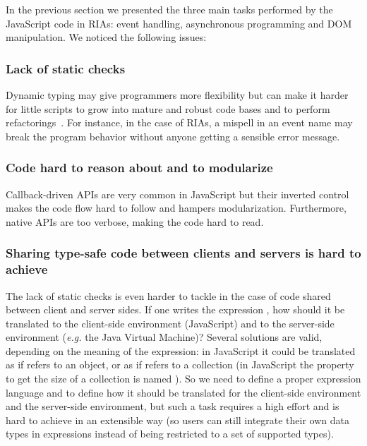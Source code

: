 \documentclass[american,english,runningheads]{llncs}
\newcommand{\eg}{\emph{e.g.}}
\begin{document}
In the previous section we presented the three main tasks performed by the JavaScript code in RIAs: event handling,
asynchronous programming and DOM manipulation. We noticed the following issues:

\subsubsection{Lack of static checks}

Dynamic typing may give programmers more flexibility but can make it harder for little scripts to grow into mature
and robust code bases and to perform refactorings~\cite{Meijer04_StaticDynamic}. For instance, in the case of RIAs, a
mispell in an event name may break the program behavior without anyone getting a sensible error message.

\subsubsection{Code hard to reason about and to modularize}

Callback-driven APIs are very common in JavaScript but their inverted control makes the code flow hard to follow and
hampers modularization. Furthermore, native APIs are too verbose, making the code hard to read.

\subsubsection{Sharing type-safe code between clients and servers is hard to achieve}

The lack of static checks is even harder to tackle in the case of code shared between client and server sides. If one
writes the expression , how should it be translated to the client-side environment
(JavaScript) and to the server-side environment (\eg{} the Java Virtual Machine)? Several solutions are valid,
depending on the meaning of the expression: in JavaScript it could be translated as  if 
refers to an object, or as
 if  refers to a collection (in JavaScript the property to get the size of a
collection is named ). So we need to define a proper expression language and to define how it should be
translated for the client-side environment and the server-side environment, but such a task requires a high effort
and is hard to achieve in an extensible way (so users can still integrate their own data types in expressions instead
of being restricted to a set of supported types).
\end{document}
